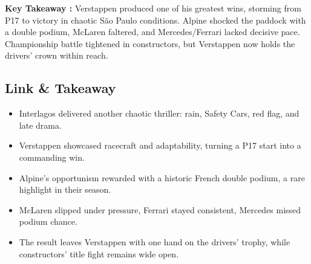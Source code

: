 \textbf{Key Takeaway :} Verstappen produced one of his greatest wins, storming from P17 to victory in chaotic São Paulo conditions. Alpine shocked the paddock with a double podium, McLaren faltered, and Mercedes/Ferrari lacked decisive pace. Championship battle tightened in constructors, but Verstappen now holds the drivers’ crown within reach.

\subsection{Link \& Takeaway}

\begin{itemize}
    \item Interlagos delivered another chaotic thriller: rain, Safety Cars, red flag, and late drama. 
    \item Verstappen showcased racecraft and adaptability, turning a P17 start into a commanding win. 
    \item Alpine’s opportunism rewarded with a historic French double podium, a rare highlight in their season. 
    \item McLaren slipped under pressure, Ferrari stayed consistent, Mercedes missed podium chance. 
    \item The result leaves Verstappen with one hand on the drivers’ trophy, while constructors’ title fight remains wide open. 
\end{itemize}
